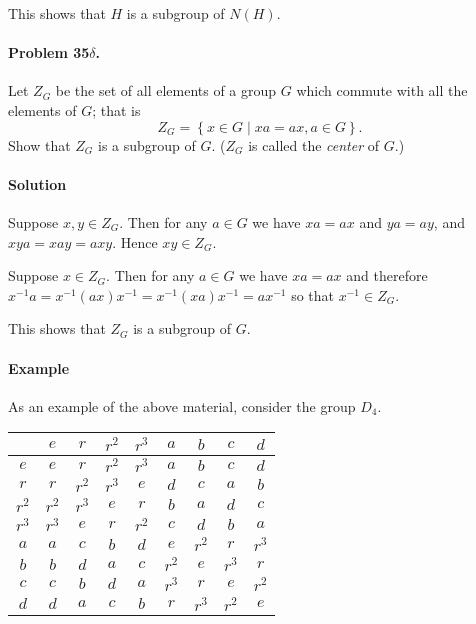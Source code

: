 This shows that $H$ is a subgroup of $N(H)$.

\paragraph{Problem 35$\delta$.}
Let $Z_G$ be the set of all elements of a group $G$ which commute with all the
elements of $G$; that is
$$ Z_G = \left\{ x \in G \mid xa = ax, a\in G \right\}.$$
Show that $Z_G$ is a subgroup of $G$. ($Z_G$ is called the \textit{center} of $G$.)

\paragraph*{Solution}
Suppose $x, y \in Z_G$. Then for any $a\in G$ we have $xa=ax$ and $ya=ay$, and
$xya=xay=axy$. Hence $xy \in Z_G$.

Suppose $x \in Z_G$. Then for any $a\in G$ we have $xa=ax$ and therefore
$x^{-1}a=x^{-1}(ax)x^{-1}=x^{-1}(xa)x^{-1}=ax^{-1}$ so that $x^{-1} \in Z_G$.

This shows that $Z_G$ is a subgroup of $G$.

\paragraph{Example}
As an example of the above material, consider the group $D_4$.

\begin{center}
\begin{tabular}{c||c|c|c|c||c|c|c|c|}
      & $e$ & $r$ & $r^2$ & $r^3$ & $a$ & $b$ & $c$ & $d$ \\
\hline \hline
$e$   & $e$ & $r$ & $r^2$ & $r^3$ & $a$ & $b$ & $c$ & $d$ \\
\hline
$r$   & $r$ & $r^2$ & $r^3$ & $e$ & $d$ & $c$ & $a$ & $b$ \\
\hline
$r^2$ & $r^2$ & $r^3$ & $e$ & $r$ & $b$ & $a$ & $d$ & $c$ \\
\hline
$r^3$ & $r^3$ & $e$ & $r$ & $r^2$ & $c$ & $d$ & $b$ & $a$ \\
\hline \hline
$a$   & $a$ & $c$ & $b$ & $d$ & $e$ & $r^2$ & $r$ & $r^3$ \\
\hline
$b$   & $b$ & $d$ & $a$ & $c$ & $r^2$ & $e$ & $r^3$ & $r$ \\
\hline
$c$   & $c$ & $b$ & $d$ & $a$ & $r^3$ & $r$ & $e$ & $r^2$ \\
\hline
$d$   & $d$ & $a$ & $c$ & $b$ & $r$ & $r^3$ & $r^2$ & $e$ \\
\hline
\end{tabular}
\end{center}

